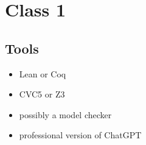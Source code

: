 \chapter{Class 1}

\newcommand{\Reals}{\mathbb{R}}

\section{Tools}
\begin{itemize}
  \item Lean or Coq 
  \item CVC5 or Z3 
  \item possibly a model checker 
  \item professional version of ChatGPT
\end{itemize}

